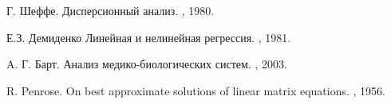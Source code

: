 \documentclass{spisok-article}
\theoremstyle{definition}
\begin{document}
\renewcommand\refname{Литература}
\begin{thebibliography}{8}
Г. Шеффе.
\newblock Дисперсионный анализ.
,
  1980.
  
    
Е.З. Демиденко
\newblock Линейная и нелинейная регрессия.
,
  1981.
   
A. Г. Барт.
\newblock Анализ медико-биологических систем.
,
  2003.

R. Penrose.
\newblock On best approximate solutions of linear matrix equations.
,
1956.


\end{thebibliography}
\end{document}
